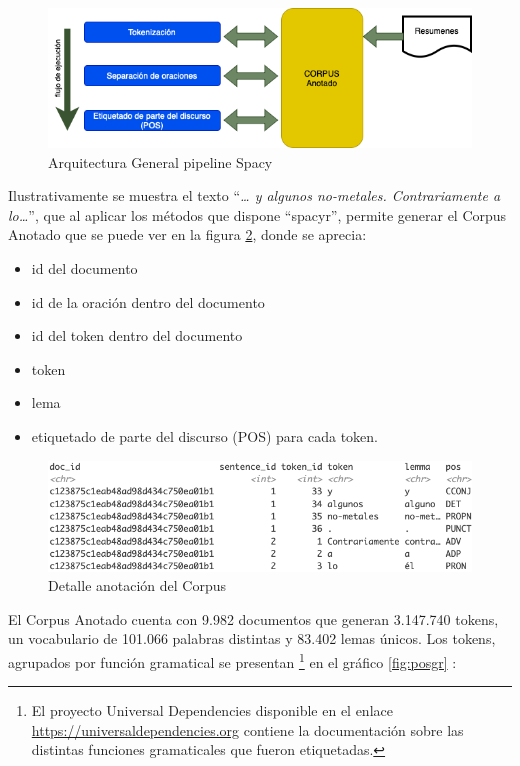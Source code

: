 \documentclass[
  12pt,
  openany]{book}
\begin{document}
\begin{figure}

{\centering \includegraphics[width=0.8\linewidth]{images/05-desarrollo/2_ciclo/nlp/spacy_pipeline1} 

}

\caption{Arquitectura General pipeline Spacy}\label{fig:spacypi}
\end{figure}

Ilustrativamente se muestra el texto ``\emph{\ldots{} y algunos no-metales. Contrariamente a lo\ldots{}}'', que al aplicar los métodos que dispone ``spacyr'', permite generar el Corpus Anotado que se puede ver en la figura \ref{fig:corpusano}, donde se aprecia:

\begin{itemize}
\item
  id del documento
\item
  id de la oración dentro del documento
\item
  id del token dentro del documento
\item
  token
\item
  lema
\item
  etiquetado de parte del discurso (POS) para cada token.
\end{itemize}

\begin{figure}

{\centering \includegraphics[width=0.9\linewidth]{images/05-desarrollo/2_ciclo/nlp/corpusanotado2} 

}

\caption{Detalle anotación del Corpus}\label{fig:corpusano}
\end{figure}

El Corpus Anotado cuenta con 9.982 documentos que generan 3.147.740 tokens, un vocabulario de 101.066 palabras distintas y 83.402 lemas únicos. Los tokens, agrupados por función gramatical se presentan \footnote{El proyecto Universal Dependencies disponible en el enlace \url{https://universaldependencies.org} contiene la documentación sobre las distintas funciones gramaticales que fueron etiquetadas.} en el gráfico \ref{fig:posgr} :
\end{document}
